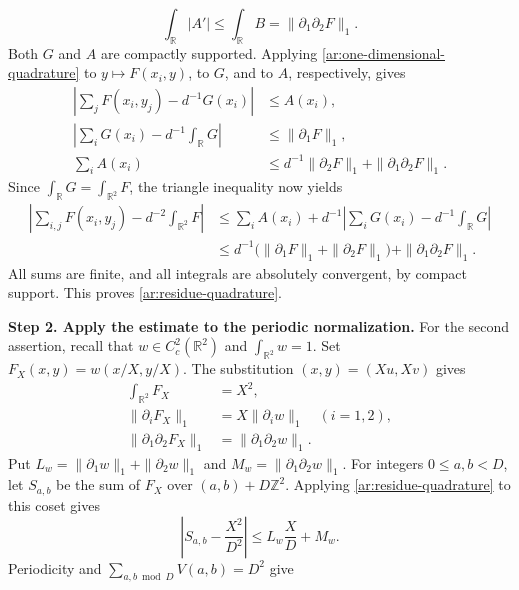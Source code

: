 \documentclass[twoside]{aomart}
\makeatletter
\theoremstyle{paperplain}
\theoremstyle{paperdefinition}
\renewenvironment{proof}[1][\proofname]{\par\pushQED{\qed}%
  \normalfont\topsep6\p@\@plus3\p@\relax\trivlist
  \item[\hskip\labelsep\itshape #1\@addpunct{.}]\ignorespaces
}{\popQED\endtrivlist\@endpefalse}
\newcommand{\Z}{\mathbb Z}
\newcommand{\R}{\mathbb R}
\numberwithin{equation}{section}
\makeatother
\begin{document}
\begin{proof}
\begin{equation}
 \int_\R|A'|\le\int_\R B=\|\partial_1\partial_2F\|_1.
\end{equation}
Both $G$ and $A$ are compactly supported. Applying
\eqref{ar:one-dimensional-quadrature} to
$y\mapsto F(x_i,y)$, to $G$, and to $A$, respectively, gives
\begin{equation}
 \begin{aligned}
 \left|\sum_jF(x_i,y_j)-d^{-1}G(x_i)\right|&\le A(x_i),\\
 \left|\sum_iG(x_i)-d^{-1}\int_\R G\right|
   &\le\|\partial_1F\|_1,\\
 \sum_iA(x_i)&\le d^{-1}\|\partial_2F\|_1
                     +\|\partial_1\partial_2F\|_1.
 \end{aligned}
\end{equation}
Since $\int_\R G=\int_{\R^2}F$, the triangle inequality now yields
\begin{equation}
 \begin{aligned}
 \left|\sum_{i,j}F(x_i,y_j)-d^{-2}\int_{\R^2}F\right|
 &\le\sum_i A(x_i)
   +d^{-1}\left|\sum_iG(x_i)-d^{-1}\int_\R G\right|\\
 &\le d^{-1}\bigl(\|\partial_1F\|_1+\|\partial_2F\|_1\bigr)
      +\|\partial_1\partial_2F\|_1.
 \end{aligned}
\end{equation}
All sums are finite, and all integrals are absolutely
convergent, by compact support. This proves
\eqref{ar:residue-quadrature}.
\par
\medskip
\noindent\textbf{Step 2. Apply the estimate to the periodic normalization.}
For the second assertion, recall that $w\in C_c^2(\R^2)$
and $\int_{\R^2}w=1$. Set $F_X(x,y)=w(x/X,y/X)$.
The substitution $(x,y)=(Xu,Xv)$ gives
\begin{equation}
 \begin{aligned}
 \int_{\R^2}F_X&=X^2,\\
 \|\partial_iF_X\|_1&=X\|\partial_iw\|_1\quad(i=1,2),\\
 \|\partial_1\partial_2F_X\|_1&=\|\partial_1\partial_2w\|_1.
 \end{aligned}
\end{equation}
Put $L_w=\|\partial_1w\|_1+\|\partial_2w\|_1$ and
$M_w=\|\partial_1\partial_2w\|_1$.
For integers $0\le a,b<D$, let $S_{a,b}$ be the sum of $F_X$
over $(a,b)+D\Z^2$.
Applying \eqref{ar:residue-quadrature} to this coset gives
\begin{equation}
 \left|S_{a,b}-\frac{X^2}{D^2}\right|
 \le L_w\frac XD+M_w.
\end{equation}
Periodicity and $\sum_{a,b\bmod D}V(a,b)=D^2$ give

\end{proof}
\end{document}
